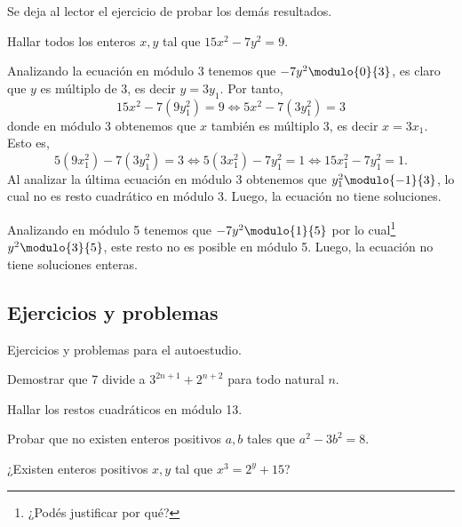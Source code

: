 Se deja al lector el ejercicio de probar los demás resultados.

\begin{example}
    Hallar todos los enteros $x,y$ tal que $15x^2 - 7y^2 = 9$.
\end{example}
\begin{solution}[1]
    Analizando la ecuación en módulo 3 tenemos que $-7y^2 \modulo{0}{3}$, es claro que $y$ es múltiplo de 3, es decir $y = 3y_1$.
    Por tanto,
    \[
        15x^2 - 7(9y_1^2) = 9 \iff 5x^2 - 7(3y_1^2) = 3
    \]
    donde en módulo 3 obtenemos que $x$ también es múltiplo 3, es decir $x = 3x_1$.
    Esto es,
    \[
        5(9x_1^2) - 7(3y_1^2) = 3 \iff 5(3x_1^2) - 7y_1^2 = 1 \iff 15x_1^2 - 7y_1^2 = 1.
    \]
    Al analizar la última ecuación en módulo 3 obtenemos que $y_1^2 \modulo{-1}{3}$, lo cual no es resto cuadrático en módulo 3.
    Luego, la ecuación no tiene soluciones.
\end{solution}

\begin{solution}[2]
    Analizando en módulo 5 tenemos que $-7y^2 \modulo{1}{5}$ por lo cual\footnote{¿Podés justificar por qué?} $y^2 \modulo{3}{5}$,
    este resto no es posible en módulo 5.
    Luego, la ecuación no tiene soluciones enteras.
\end{solution}


\subsection{Ejercicios y problemas}

Ejercicios y problemas para el autoestudio.

\begin{exercise}
    Demostrar que 7 divide a $3^{2n + 1} + 2^{n + 2}$ para todo natural $n$.
\end{exercise}

\begin{exercise}
    Hallar los restos cuadráticos en módulo 13.
\end{exercise}

\begin{exercise}
    Probar que no existen enteros positivos $a,b$ tales que $a^2 - 3b^2 = 8$.
\end{exercise}

\begin{exercise}
    ¿Existen enteros positivos $x,y$ tal que $x^3 = 2^y + 15$?
\end{exercise}

